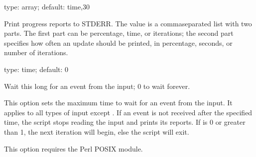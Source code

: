\documentclass[letterpaper,10pt,english]{sphinxmanual}
\begin{document}

\begin{fulllineitems}
\label{\detokenize{mariadb-query-digest:cmdoption-mariadb-query-digest-progress}}
type: array; default: time,30

Print progress reports to STDERR.  The value is a comma\sphinxhyphen{}separated list with two
parts.  The first part can be percentage, time, or iterations; the second part
specifies how often an update should be printed, in percentage, seconds, or
number of iterations.

\end{fulllineitems}


\begin{fulllineitems}
\label{\detokenize{mariadb-query-digest:cmdoption-mariadb-query-digest-read-timeout}}
type: time; default: 0

Wait this long for an event from the input; 0 to wait forever.

This option sets the maximum time to wait for an event from the input.  It
applies to all types of input except {\hyperref[\detokenize{mariadb-query-digest:cmdoption-mariadb-query-digest-processlist}]{}}.  If an
event is not received after the specified time, the script stops reading the
input and prints its reports.  If {\hyperref[\detokenize{mariadb-query-digest:cmdoption-mariadb-query-digest-iterations}]{}} is 0 or greater than
1, the next iteration will begin, else the script will exit.

This option requires the Perl POSIX module.

\end{fulllineitems}
\end{document}

